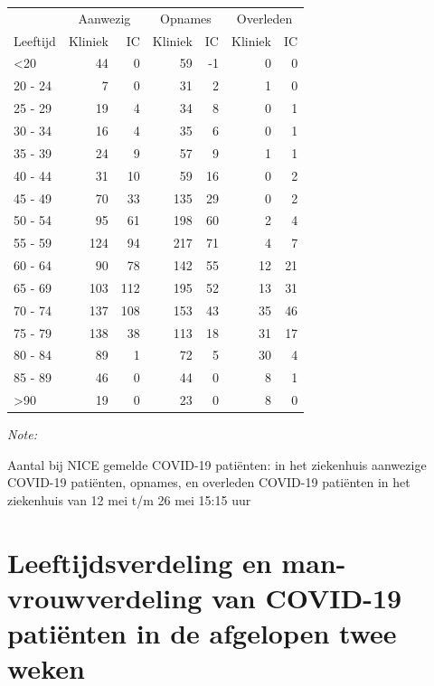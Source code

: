 \documentclass[
  english,
  man,floatsintext]{apa6}
\begin{document}
\begin{table}
\centering\begingroup\fontsize{10}{12}\selectfont

\begin{threeparttable}
\begin{tabular}{lrrrrrr}
\toprule
\multicolumn{1}{c}{ } & \multicolumn{2}{c}{Aanwezig} & \multicolumn{2}{c}{Opnames} & \multicolumn{2}{c}{Overleden} \\
\cmidrule(l{3pt}r{3pt}){2-3} \cmidrule(l{3pt}r{3pt}){4-5} \cmidrule(l{3pt}r{3pt}){6-7}
Leeftijd & Kliniek & IC & Kliniek & IC & Kliniek & IC\\
\midrule
<20 & 44 & 0 & 59 & -1 & 0 & 0\\
20 - 24 & 7 & 0 & 31 & 2 & 1 & 0\\
25 - 29 & 19 & 4 & 34 & 8 & 0 & 1\\
30 - 34 & 16 & 4 & 35 & 6 & 0 & 1\\
35 - 39 & 24 & 9 & 57 & 9 & 1 & 1\\
40 - 44 & 31 & 10 & 59 & 16 & 0 & 2\\
45 - 49 & 70 & 33 & 135 & 29 & 0 & 2\\
50 - 54 & 95 & 61 & 198 & 60 & 2 & 4\\
55 - 59 & 124 & 94 & 217 & 71 & 4 & 7\\
60 - 64 & 90 & 78 & 142 & 55 & 12 & 21\\
65 - 69 & 103 & 112 & 195 & 52 & 13 & 31\\
70 - 74 & 137 & 108 & 153 & 43 & 35 & 46\\
75 - 79 & 138 & 38 & 113 & 18 & 31 & 17\\
80 - 84 & 89 & 1 & 72 & 5 & 30 & 4\\
85 - 89 & 46 & 0 & 44 & 0 & 8 & 1\\
>90 & 19 & 0 & 23 & 0 & 8 & 0\\
\bottomrule
\end{tabular}
\begin{tablenotes}
\item \textit{Note: } 
\item Aantal bij NICE gemelde COVID-19 patiënten: in het ziekenhuis aanwezige COVID-19 patiënten, opnames, en overleden COVID-19 patiënten in het ziekenhuis van 12 mei t/m 26 mei 15:15 uur
\end{tablenotes}
\end{threeparttable}
\endgroup{}
\end{table}

\newpage

\hypertarget{leeftijdsverdeling-en-man-vrouwverdeling-van-covid-19-patiuxebnten-in-de-afgelopen-twee-weken}{%
\section{Leeftijdsverdeling en man-vrouwverdeling van COVID-19 patiënten in de afgelopen twee weken}\label{leeftijdsverdeling-en-man-vrouwverdeling-van-covid-19-patiuxebnten-in-de-afgelopen-twee-weken}}
\end{document}
